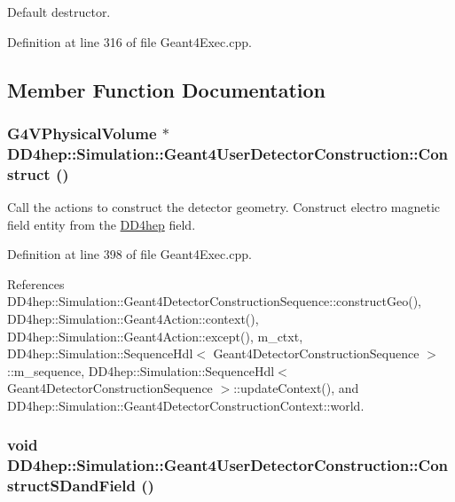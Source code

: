 Default destructor. 

Definition at line 316 of file Geant4Exec.cpp.

\subsection{Member Function Documentation}
\hypertarget{class_d_d4hep_1_1_simulation_1_1_geant4_user_detector_construction_a93280a762663896986d38ece7afd1abc}{
\subsubsection[{Construct}]{\setlength{\rightskip}{0pt plus 5cm}G4VPhysicalVolume $\ast$ DD4hep::Simulation::Geant4UserDetectorConstruction::Construct ()}}
\label{class_d_d4hep_1_1_simulation_1_1_geant4_user_detector_construction_a93280a762663896986d38ece7afd1abc}


Call the actions to construct the detector geometry. Construct electro magnetic field entity from the \hyperlink{namespace_d_d4hep}{DD4hep} field. 

Definition at line 398 of file Geant4Exec.cpp.

References DD4hep::Simulation::Geant4DetectorConstructionSequence::constructGeo(), DD4hep::Simulation::Geant4Action::context(), DD4hep::Simulation::Geant4Action::except(), m\_\-ctxt, DD4hep::Simulation::SequenceHdl$<$ Geant4DetectorConstructionSequence $>$::m\_\-sequence, DD4hep::Simulation::SequenceHdl$<$ Geant4DetectorConstructionSequence $>$::updateContext(), and DD4hep::Simulation::Geant4DetectorConstructionContext::world.\hypertarget{class_d_d4hep_1_1_simulation_1_1_geant4_user_detector_construction_ab384a947bde0262d2c86f3f83099e4c4}{
\subsubsection[{ConstructSDandField}]{\setlength{\rightskip}{0pt plus 5cm}void DD4hep::Simulation::Geant4UserDetectorConstruction::ConstructSDandField ()}}
\label{class_d_d4hep_1_1_simulation_1_1_geant4_user_detector_construction_ab384a947bde0262d2c86f3f83099e4c4}


